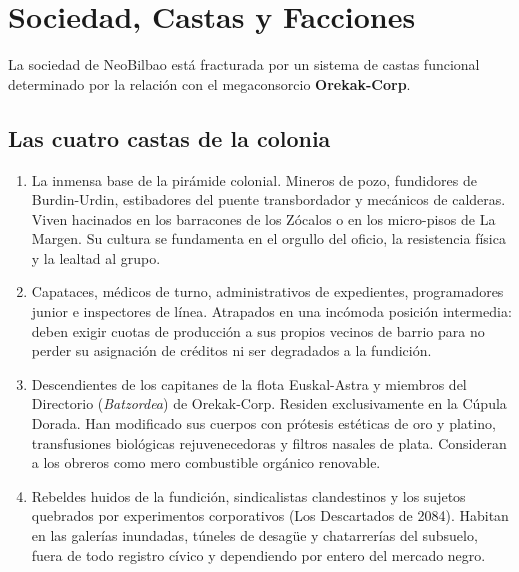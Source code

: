\chapter{Sociedad, Castas y Facciones}


La sociedad de NeoBilbao está fracturada por un sistema de castas funcional determinado por la relación con el megaconsorcio \textbf{Orekak-Corp}.

\section{Las cuatro castas de la colonia}

\begin{enumerate}
  \item {} La inmensa base de la pirámide colonial. Mineros de pozo, fundidores de Burdin-Urdin, estibadores del puente transbordador y mecánicos de calderas. Viven hacinados en los barracones de los Zócalos o en los micro-pisos de La Margen. Su cultura se fundamenta en el orgullo del oficio, la resistencia física y la lealtad al grupo.
  
  \item {} Capataces, médicos de turno, administrativos de expedientes, programadores junior e inspectores de línea. Atrapados en una incómoda posición intermedia: deben exigir cuotas de producción a sus propios vecinos de barrio para no perder su asignación de créditos ni ser degradados a la fundición.
  
  \item {} Descendientes de los capitanes de la flota Euskal-Astra y miembros del Directorio (\emph{Batzordea}) de Orekak-Corp. Residen exclusivamente en la Cúpula Dorada. Han modificado sus cuerpos con prótesis estéticas de oro y platino, transfusiones biológicas rejuvenecedoras y filtros nasales de plata. Consideran a los obreros como mero combustible orgánico renovable.
  
  \item {} Rebeldes huidos de la fundición, sindicalistas clandestinos y los sujetos quebrados por experimentos corporativos (Los Descartados de 2084). Habitan en las galerías inundadas, túneles de desagüe y chatarrerías del subsuelo, fuera de todo registro cívico y dependiendo por entero del mercado negro.
\end{enumerate}

